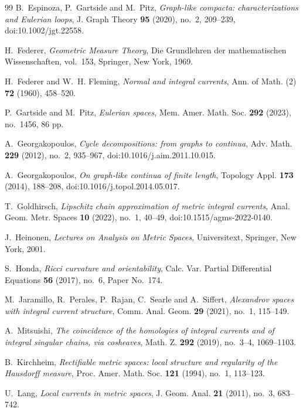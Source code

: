 \documentclass[11pt]{article}
\theoremstyle{remark}
\begin{document}
\begin{thebibliography}{99}
B.~Espinoza, P.~Gartside and M.~Pitz,
\emph{Graph-like compacta: characterizations and Eulerian loops},
J. Graph Theory \textbf{95} (2020), no.~2, 209--239, doi:10.1002/jgt.22558.

H.~Federer,
\emph{Geometric Measure Theory},
Die Grundlehren der mathematischen Wissenschaften, vol.~153, Springer, New York, 1969.

H.~Federer and W.~H. Fleming,
\emph{Normal and integral currents},
Ann. of Math. (2) \textbf{72} (1960), 458--520.

P.~Gartside and M.~Pitz,
\emph{Eulerian spaces},
Mem. Amer. Math. Soc. \textbf{292} (2023), no.~1456, 86 pp.

A.~Georgakopoulos,
\emph{Cycle decompositions: from graphs to continua},
Adv. Math. \textbf{229} (2012), no.~2, 935--967, doi:10.1016/j.aim.2011.10.015.

A.~Georgakopoulos,
\emph{On graph-like continua of finite length},
Topology Appl. \textbf{173} (2014), 188--208, doi:10.1016/j.topol.2014.05.017.

T.~Goldhirsch,
\emph{Lipschitz chain approximation of metric integral currents},
Anal. Geom. Metr. Spaces \textbf{10} (2022), no.~1, 40--49, doi:10.1515/agms-2022-0140.

J.~Heinonen,
\emph{Lectures on Analysis on Metric Spaces},
Universitext, Springer, New York, 2001.

S.~Honda,
\emph{Ricci curvature and orientability},
Calc. Var. Partial Differential Equations \textbf{56} (2017), no.~6, Paper No.~174.

M.~Jaramillo, R.~Perales, P.~Rajan, C.~Searle and A.~Siffert,
\emph{Alexandrov spaces with integral current structure},
Comm. Anal. Geom. \textbf{29} (2021), no.~1, 115--149.

A.~Mitsuishi,
\emph{The coincidence of the homologies of integral currents and of integral singular chains, via cosheaves},
Math. Z. \textbf{292} (2019), no.~3--4, 1069--1103.

B.~Kirchheim,
\emph{Rectifiable metric spaces: local structure and regularity of the Hausdorff measure},
Proc. Amer. Math. Soc. \textbf{121} (1994), no.~1, 113--123.

U.~Lang,
\emph{Local currents in metric spaces},
J. Geom. Anal. \textbf{21} (2011), no.~3, 683--742.


\end{thebibliography}
\end{document}
